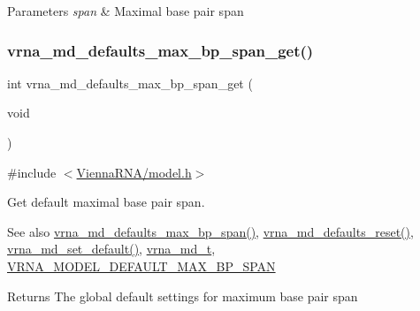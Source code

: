\begin{DoxyParams}{Parameters}
{\em span} & Maximal base pair span \\
\hline
\end{DoxyParams}
\mbox{\label{group__model__details_gaa60f989e062fecd4d4bac89c1883da85}} 
\subsubsection{\texorpdfstring{vrna\_md\_defaults\_max\_bp\_span\_get()}{vrna\_md\_defaults\_max\_bp\_span\_get()}}
{\footnotesize\ttfamily int vrna\+\_\+md\+\_\+defaults\+\_\+max\+\_\+bp\+\_\+span\+\_\+get (\begin{DoxyParamCaption}\item[{void}]{ }\end{DoxyParamCaption})}



{\ttfamily \#include $<$\mbox{\hyperlink{model_8h}{Vienna\+R\+N\+A/model.\+h}}$>$}



Get default maximal base pair span. 

\begin{DoxySeeAlso}{See also}
\mbox{\hyperlink{group__model__details_ga4c4bc962f09b4480cb8499f1cf8ae4ec}{vrna\+\_\+md\+\_\+defaults\+\_\+max\+\_\+bp\+\_\+span()}}, \mbox{\hyperlink{group__model__details_ga70834424cf804d149937de89f80ceb45}{vrna\+\_\+md\+\_\+defaults\+\_\+reset()}}, \mbox{\hyperlink{group__model__details_ga8ac6ff84936282436f822644bf841f66}{vrna\+\_\+md\+\_\+set\+\_\+default()}}, \mbox{\hyperlink{group__model__details_ga1f8a10e12a0a1915f2a4eff0b28ea17c}{vrna\+\_\+md\+\_\+t}}, \mbox{\hyperlink{group__model__details_ga7cb6f4ae8fdebff6746a4410814f2977}{V\+R\+N\+A\+\_\+\+M\+O\+D\+E\+L\+\_\+\+D\+E\+F\+A\+U\+L\+T\+\_\+\+M\+A\+X\+\_\+\+B\+P\+\_\+\+S\+P\+AN}} 
\end{DoxySeeAlso}
\begin{DoxyReturn}{Returns}
The global default settings for maximum base pair span 
\end{DoxyReturn}
\mbox{\label{group__model__details_gac152f1e78c1058a10261022c8dfda0f7}} 
